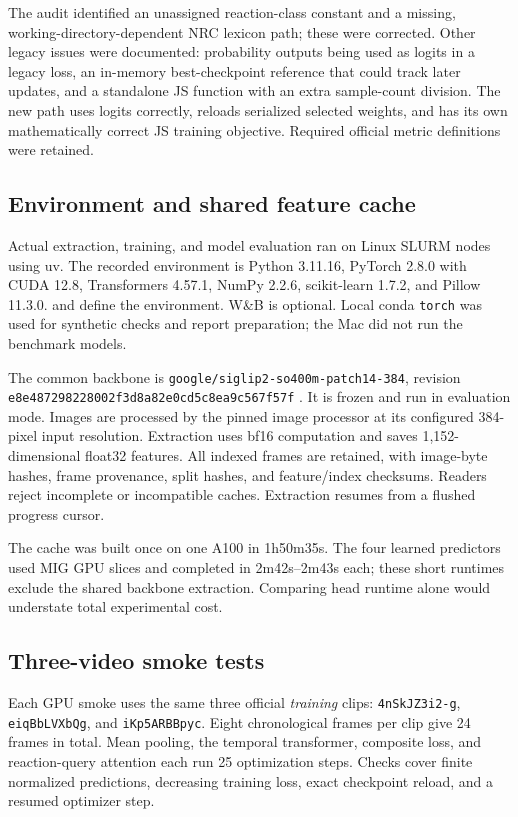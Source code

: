 \documentclass[11pt,a4paper]{article}
\newcommand{\code}[1]{\texttt{#1}}
\begin{document}
The audit identified an unassigned reaction-class constant and a missing, working-directory-dependent NRC lexicon path; these were corrected. Other legacy issues were documented: probability outputs being used as logits in a legacy loss, an in-memory best-checkpoint reference that could track later updates, and a standalone JS function with an extra sample-count division. The new path uses logits correctly, reloads serialized selected weights, and has its own mathematically correct JS training objective. Required official metric definitions were retained.

\subsection{Environment and shared feature cache}
Actual extraction, training, and model evaluation ran on Linux SLURM nodes using uv. The recorded environment is Python 3.11.16, PyTorch 2.8.0 with CUDA 12.8, Transformers 4.57.1, NumPy 2.2.6, scikit-learn 1.7.2, and Pillow 11.3.0.  and  define the environment. W\&B is optional. Local conda \code{torch} was used for synthetic checks and report preparation; the Mac did not run the benchmark models.

The common backbone is \nolinkurl{google/siglip2-so400m-patch14-384}, revision \nolinkurl{e8e487298228002f3d8a82e0cd5c8ea9c567f57f} \cite{siglip}. It is frozen and run in evaluation mode. Images are processed by the pinned image processor at its configured 384-pixel input resolution. Extraction uses bf16 computation and saves 1,152-dimensional float32 features. All indexed frames are retained, with image-byte hashes, frame provenance, split hashes, and feature/index checksums. Readers reject incomplete or incompatible caches. Extraction resumes from a flushed progress cursor.

The cache was built once on one A100 in 1h50m35s. The four learned predictors used MIG GPU slices and completed in 2m42s--2m43s each; these short runtimes exclude the shared backbone extraction. Comparing head runtime alone would understate total experimental cost.

\subsection{Three-video smoke tests}
Each GPU smoke uses the same three official \emph{training} clips: \code{4nSkJZ3i2-g}, \code{eiqBbLVXbQg}, and \code{iKp5ARBBpyc}. Eight chronological frames per clip give 24 frames in total. Mean pooling, the temporal transformer, composite loss, and reaction-query attention each run 25 optimization steps. Checks cover finite normalized predictions, decreasing training loss, exact checkpoint reload, and a resumed optimizer step.
\end{document}
